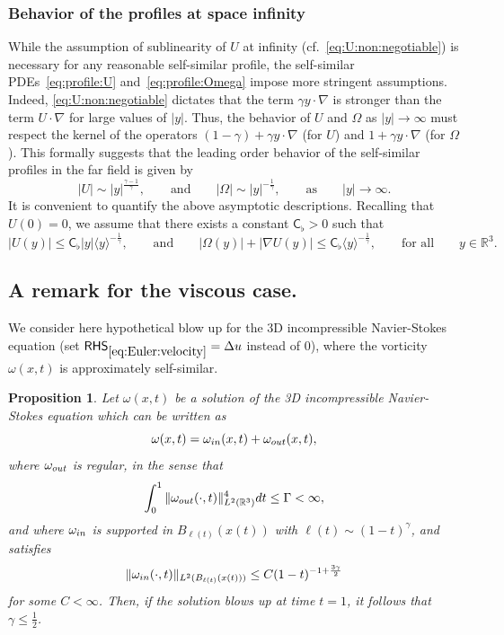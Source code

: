 \documentclass[10pt,a4paper]{amsart}
\theoremstyle{plain}
\newtheorem{proposition}[theorem]{Proposition}
\theoremstyle{remark}
\newcommand{\fr}{\frac}
\newcommand{\Rr}{{\mathbb R}}
\begin{document}
 

\subsubsection{Behavior of the profiles at space infinity}
While the assumption of  sublinearity of $U$ at infinity (cf.~\eqref{eq:U:non:negotiable}) is necessary for any reasonable self-similar profile, the self-similar PDEs~\eqref{eq:profile:U} and~\eqref{eq:profile:Omega} impose more stringent assumptions. Indeed, \eqref{eq:U:non:negotiable} dictates that the term $\gamma y \cdot \nabla$ is stronger than the term $U \cdot \nabla$ for large values of $|y|$. Thus, the behavior of $U$ and $\Omega$ as $|y|\to \infty$ must respect the kernel of the operators $(1-\gamma) + \gamma y \cdot \nabla$ (for $U$) and $1 +\gamma y \cdot \nabla$ (for $\Omega$). This formally suggests that the leading order behavior of the self-similar profiles in the far field is given by 
\[
|U| \sim |y|^{\frac{\gamma-1}{\gamma}} ,
\qquad\mbox{and}\qquad
|\Omega| \sim |y|^{-\frac{1}{\gamma}},
\qquad\mbox{as} \qquad |y|\to \infty.
\]
It is convenient to quantify the above asymptotic descriptions. Recalling that $U(0) = 0$, we assume that there exists a constant $\mathsf{C}_\flat > 0 $ such that
\begin{equation}
  |U(y)| \leq \mathsf{C}_\flat |y| \langle y\rangle^{-\frac{1}{\gamma}},
  \qquad
  \mbox{and}
  \qquad
  |\Omega(y)| + |\nabla U(y)| \leq \mathsf{C}_\flat  \langle y\rangle^{-\frac{1}{\gamma}},
  \qquad
  \mbox{for all}
  \qquad y\in\mathbb{R}^3.
  \label{eq:ass:medium:rare}
\end{equation}

\subsection{A remark for the viscous case.}
We consider here hypothetical  blow up  for the 3D incompressible Navier-Stokes equation {(set $\mathsf{RHS}_{\eqref{eq:Euler:velocity}} = \Delta u$ instead of $0$)}, where the vorticity $\omega(x,t)$ is approximately self-similar.


\begin{proposition}\label{nse}
Let $\omega(x,t)$ be a solution of the 3D incompressible Navier-Stokes equation which can be written as
\begin{equation*}
\omega(x,t) 
= {\omega_{\rm in}(x,t)} + \omega_{\rm out}(x,t),
\end{equation*}
where $\omega_{\rm out}$ is regular, in the sense that
\begin{equation}
\int_0^{{1}} \|\omega_{\rm out}(\cdot,t)\|_{L^2(\Rr^3)}^4dt 
\le \Gamma<\infty,
\label{omegaoutfine}
\end{equation}
and where $\omega_{\rm in}$ is supported in $B_{\ell(t)}(x(t))$
 with $\ell(t)\sim (1-t)^{\gamma}$, {and satisfies}
\begin{equation}
\|\omega_{\rm in}(\cdot,t)\|_{L^2(B_{\ell(t)}(x(t)))} \le  C (1-t)^{-1+\fr{3\gamma}{2}}
\label{omegainbad}
\end{equation}
{for some $C<\infty$.}
Then, if the solution blows up at time $t=1$, it follows that $\gamma\leq \frac{1}{2}$.
\end{proposition}
\end{document}
